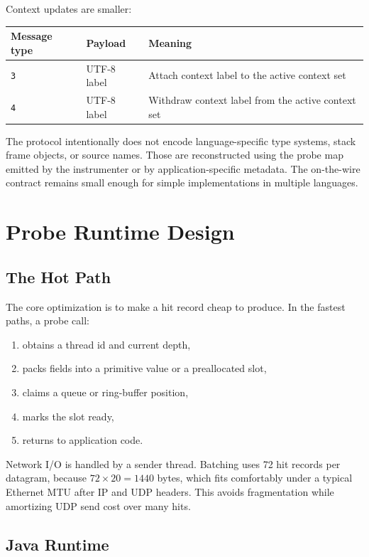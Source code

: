 \documentclass[11pt]{article}
\newcommand{\code}[1]{\texttt{#1}}
\begin{document}
Context updates are smaller:

\begin{center}
\begin{tabular}{lll}
\textbf{Message type} & \textbf{Payload} & \textbf{Meaning} \\
\hline
\code{3} & UTF-8 label & Attach context label to the active context set \\
\code{4} & UTF-8 label & Withdraw context label from the active context set \\
\end{tabular}
\end{center}

The protocol intentionally does not encode language-specific type systems,
stack frame objects, or source names. Those are reconstructed using the probe
map emitted by the instrumenter or by application-specific metadata. The
on-the-wire contract remains small enough for simple implementations in
multiple languages.

\section{Probe Runtime Design}

\subsection{The Hot Path}

The core optimization is to make a hit record cheap to produce. In the fastest
paths, a probe call:

\begin{enumerate}
  \item obtains a thread id and current depth,
  \item packs fields into a primitive value or a preallocated slot,
  \item claims a queue or ring-buffer position,
  \item marks the slot ready,
  \item returns to application code.
\end{enumerate}

Network I/O is handled by a sender thread. Batching uses 72 hit records per
datagram, because \(72 \times 20 = 1440\) bytes, which fits comfortably under a
typical Ethernet MTU after IP and UDP headers. This avoids fragmentation while
amortizing UDP send cost over many hits.

\subsection{Java Runtime}
\end{document}
